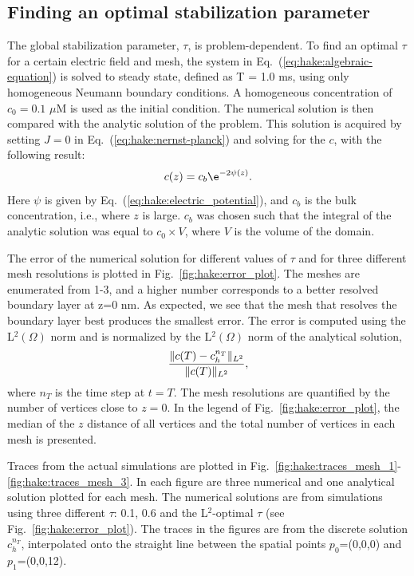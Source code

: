 \subsection{Finding an optimal stabilization parameter}
The global stabilization parameter, $\tau$, is problem-dependent. To
find an optimal $\tau$ for a certain electric field and mesh, the
system in Eq.~(\ref{eq:hake:algebraic-equation}) is solved to steady
state, defined as T = 1.0 ms, using only homogeneous Neumann boundary
conditions. A homogeneous concentration of $c_0=0.1$ $\mu$M is used as
the initial condition. The numerical solution is then compared with
the analytic solution of the problem. This solution is acquired by
setting $J=0$ in Eq.~(\ref{eq:hake:nernst-planck}) and solving for the
$c$, with the following result:
\begin{equation}
  \label{eq:hake:analytic-solution}
  c(z) = c_b\e^{-2\psi(z)}.
\end{equation}
Here $\psi$ is given by Eq.~(\ref{eq:hake:electric_potential}), and
$c_b$ is the bulk concentration, i.e., where $z$ is large. $c_b$ was
chosen such that the integral of the analytic solution was equal to
$c_0\times V$, where $V$ is the volume of the domain.\par

The error of the numerical solution for different values of $\tau$ and
for three different mesh resolutions is plotted in
Fig.~\ref{fig:hake:error_plot}. The meshes are enumerated from 1-3,
and a higher number corresponds to a better resolved boundary layer at
z=0 nm. As expected, we see that the mesh that resolves the boundary
layer best produces the smallest error. The error is computed using
the L$^2(\Omega)$ norm and is normalized by the L$^2(\Omega)$ norm of
the analytical solution,
\begin{equation}
  \label{eq:hake:error_norm}
  \frac{\|c(T)-c_h^{n_T}\|_{L^2}}{\|c(T)\|_{L^2}},
\end{equation}
where $n_T$ is the time step at $t=T$. The mesh resolutions are
quantified by the number of vertices close to $z=0$. In the legend of
Fig.~\ref{fig:hake:error_plot}, the median of the $z$ distance of all
vertices and the total number of vertices in each mesh is
presented.\par

Traces from the actual simulations are plotted in
Fig.~\ref{fig:hake:traces_mesh_1}-\ref{fig:hake:traces_mesh_3}. In
each figure are three numerical and one analytical solution plotted
for each mesh. The numerical solutions are from simulations using
three different $\tau$: 0.1, 0.6 and the L$^2$-optimal $\tau$ (see
Fig.~\ref{fig:hake:error_plot}). The traces in the figures are from
the discrete solution $c_h^{n_T}$, interpolated onto the straight line
between the spatial points $p_0$=(0,0,0) and $p_1$=(0,0,12).\par

